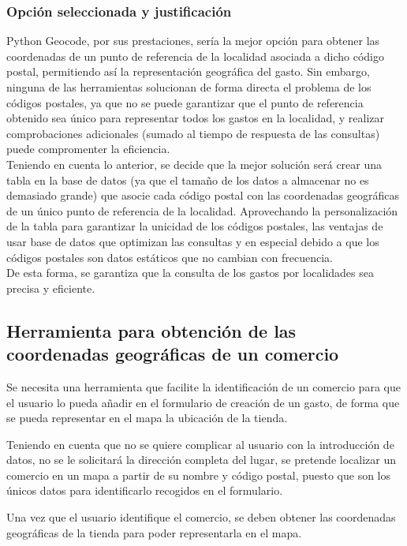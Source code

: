 \subsubsection{Opción seleccionada y justificación}\label{sec:justificacion_pgeocode}
Python Geocode, por sus prestaciones, sería la mejor opción para obtener las coordenadas de un punto de referencia de la localidad asociada a dicho código postal, permitiendo así la representación geográfica del gasto. Sin embargo, ninguna de las herramientas solucionan de forma directa el problema de los códigos postales, ya que no se puede garantizar que el punto de referencia obtenido sea único para representar todos los gastos en la localidad, y realizar comprobaciones adicionales (sumado al tiempo de respuesta de las consultas) puede compromenter la eficiencia.\\
Teniendo en cuenta lo anterior, se decide que la mejor solución será crear una tabla en la base de datos (ya que el tamaño de los datos a almacenar no es demasiado grande) que asocie cada código postal con las coordenadas geográficas de un único punto de referencia de la localidad. Aprovechando la personalización de la tabla para garantizar la unicidad de los códigos postales, las ventajas de usar base de datos que optimizan las consultas y en especial debido a que los códigos postales son datos estáticos que no cambian con frecuencia.\\
De esta forma, se garantiza que la consulta de los gastos por localidades sea precisa y eficiente.


\subsection{Herramienta para obtención de las coordenadas geográficas de un comercio}
Se necesita una herramienta que facilite la identificación de un comercio para que el usuario lo pueda añadir en el formulario de creación de un gasto, de forma que se pueda representar en el mapa la ubicación de la tienda.

Teniendo en cuenta que no se quiere complicar al usuario con la introducción de datos, no se le solicitará la dirección completa del lugar, se pretende localizar un comercio en un mapa a partir de su nombre y código postal, puesto que son los únicos datos para identificarlo recogidos en el formulario.

Una vez que el usuario identifique el comercio, se deben obtener las coordenadas geográficas de la tienda para poder representarla en el mapa.\\

